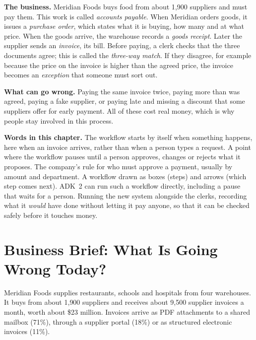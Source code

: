 \begin{beforeyoustart}
\textbf{The business.} Meridian Foods buys food from about 1{,}900 suppliers and must pay them. This work is called \emph{accounts payable}. When Meridian orders goods, it issues a \emph{purchase order}, which states what it is buying, how many and at what price. When the goods arrive, the warehouse records a \emph{goods receipt}. Later the supplier sends an \emph{invoice}, its bill. Before paying, a clerk checks that the three documents agree; this is called the \emph{three-way match}. If they disagree, for example because the price on the invoice is higher than the agreed price, the invoice becomes an \emph{exception} that someone must sort out.

\textbf{What can go wrong.} Paying the same invoice twice, paying more than was agreed, paying a fake supplier, or paying late and missing a discount that some suppliers offer for early payment. All of these cost real money, which is why people stay involved in this process.

\textbf{Words in this chapter.}
 The workflow starts by itself when something happens, here when an invoice arrives, rather than when a person types a request.
 A point where the workflow pauses until a person approves, changes or rejects what it proposes.
 The company's rule for who must approve a payment, usually by amount and department.
 A workflow drawn as boxes (steps) and arrows (which step comes next). ADK~2 can run such a workflow directly, including a pause that waits for a person.
 Running the new system alongside the clerks, recording what it \emph{would} have done without letting it pay anyone, so that it can be checked safely before it touches money.
\end{beforeyoustart}


\section{Business Brief: What Is Going Wrong Today?}
\label{sec:inv-brief}

Meridian Foods supplies restaurants, schools and hospitals from four warehouses. It buys from about 1{,}900 suppliers and receives about 9{,}500 supplier invoices a month, worth about \$23 million. Invoices arrive as PDF attachments to a shared mailbox (71\%), through a supplier portal (18\%) or as structured electronic invoices (11\%).

